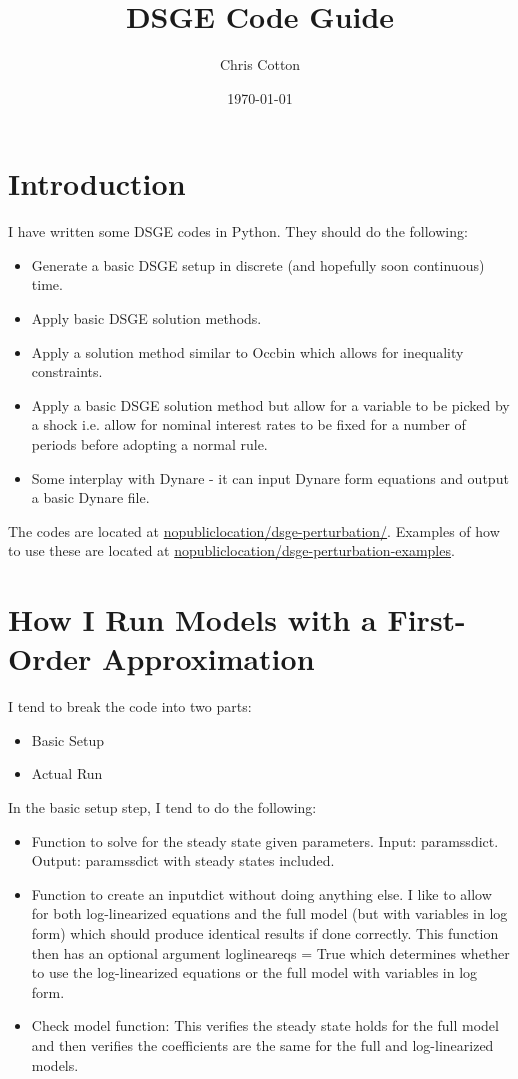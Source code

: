 \documentclass{article}
\theoremstyle{definition}
\begin{document}
\title{DSGE Code Guide}
\author{Chris Cotton}
\date{\today}
\maketitle

\section{Introduction}
I have written some DSGE codes in Python. They should do the following:
\begin{itemize}
    \item Generate a basic DSGE setup in discrete (and hopefully soon continuous) time.
    \item Apply basic DSGE solution methods.
    \item Apply a solution method similar to Occbin which allows for inequality constraints.
    \item Apply a basic DSGE solution method but allow for a variable to be picked by a shock i.e. allow for nominal interest rates to be fixed for a number of periods before adopting a normal rule.
    \item Some interplay with Dynare - it can input Dynare form equations and output a basic Dynare file.
\end{itemize}

The codes are located at \url{nopubliclocation/dsge-perturbation/}. Examples of how to use these are located at \url{nopubliclocation/dsge-perturbation-examples}.

\section{How I Run Models with a First-Order Approximation}
I tend to break the code into two parts:
\begin{itemize}
    \item Basic Setup
    \item Actual Run
\end{itemize}

In the basic setup step, I tend to do the following:
\begin{itemize}
    \item Function to solve for the steady state given parameters. Input: paramssdict. Output: paramssdict with steady states included.
    \item Function to create an inputdict without doing anything else. I like to allow for both log-linearized equations and the full model (but with variables in log form) which should produce identical results if done correctly. This function then has an optional argument loglineareqs = True which determines whether to use the log-linearized equations or the full model with variables in log form.
    \item Check model function: This verifies the steady state holds for the full model and then verifies the coefficients are the same for the full and log-linearized models.
\end{itemize}
\end{document}
